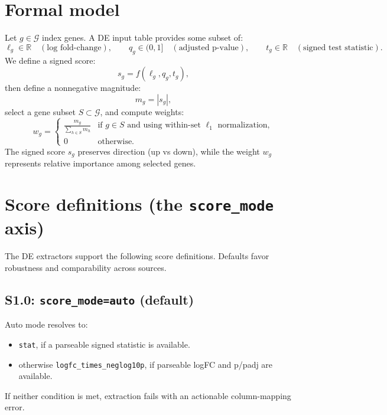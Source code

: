 \documentclass[11pt]{article}
\begin{document}
\section{Formal model}
Let $g \in \mathcal{G}$ index genes. A DE input table provides some subset of:
\[
\ell_g \in \mathbb{R} \quad (\text{log fold-change}), \qquad
q_g \in (0,1] \quad (\text{adjusted p-value}), \qquad
t_g \in \mathbb{R} \quad (\text{signed test statistic}).
\]
We define a signed score:
\begin{equation}
s_g = f(\ell_g, q_g, t_g),
\label{eq:signed_score}
\end{equation}
then define a nonnegative magnitude:
\begin{equation}
m_g = |s_g|,
\label{eq:magnitude}
\end{equation}
select a gene subset $S \subset \mathcal{G}$, and compute weights:
\begin{equation}
w_g =
\begin{cases}
\displaystyle \frac{m_g}{\sum_{h \in S} m_h} & \text{if } g \in S \text{ and using within-set } \ell_1 \text{ normalization}, \\
0 & \text{otherwise.}
\end{cases}
\label{eq:within_set_l1}
\end{equation}
The signed score $s_g$ preserves direction (up vs down), while the weight $w_g$ represents relative importance among selected genes.

\section{Score definitions (the \texttt{score\_mode} axis)}
The DE extractors support the following score definitions. Defaults favor robustness and comparability across sources.

\subsection{S1.0: \texttt{score\_mode=auto} (default)}
Auto mode resolves to:
\begin{itemize}[leftmargin=2em]
\item \texttt{stat}, if a parseable signed statistic is available.
\item otherwise \texttt{logfc\_times\_neglog10p}, if parseable logFC and p/padj are available.
\end{itemize}
If neither condition is met, extraction fails with an actionable column-mapping error.
\end{document}
